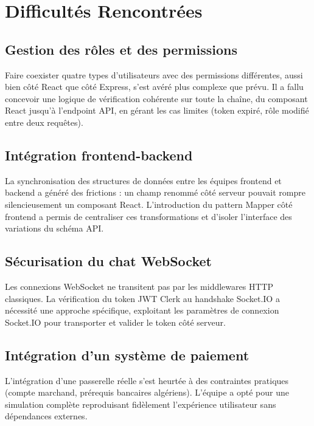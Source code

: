 \documentclass[12pt,a4paper]{report}
\begin{document}
\section{Difficultés Rencontrées}

\subsection*{Gestion des rôles et des permissions}

Faire coexister quatre types d'utilisateurs avec des permissions différentes, aussi bien côté React que côté Express, s'est avéré plus complexe que prévu. Il a fallu concevoir une logique de vérification cohérente sur toute la chaîne, du composant React jusqu'à l'endpoint API, en gérant les cas limites (token expiré, rôle modifié entre deux requêtes).

\subsection*{Intégration frontend-backend}

La synchronisation des structures de données entre les équipes frontend et backend a généré des frictions : un champ renommé côté serveur pouvait rompre silencieusement un composant React. L'introduction du pattern Mapper côté frontend a permis de centraliser ces transformations et d'isoler l'interface des variations du schéma API.

\subsection*{Sécurisation du chat WebSocket}

Les connexions WebSocket ne transitent pas par les middlewares HTTP classiques. La vérification du token JWT Clerk au handshake Socket.IO a nécessité une approche spécifique, exploitant les paramètres de connexion Socket.IO pour transporter et valider le token côté serveur.

\subsection*{Intégration d'un système de paiement}

L'intégration d'une passerelle réelle s'est heurtée à des contraintes pratiques (compte marchand, prérequis bancaires algériens). L'équipe a opté pour une simulation complète reproduisant fidèlement l'expérience utilisateur sans dépendances externes.
\end{document}
